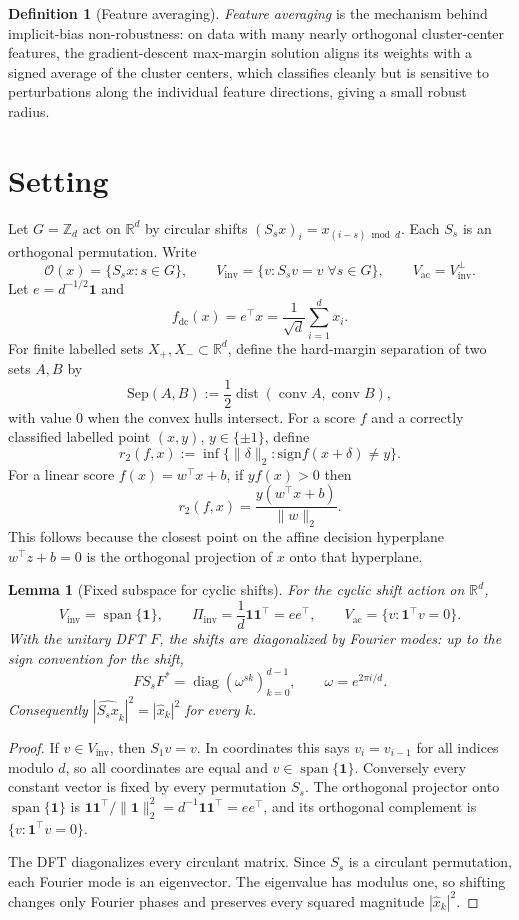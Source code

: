 \documentclass[11pt]{article}
\theoremstyle{plain}
\newtheorem{lemma}{Lemma}
\theoremstyle{definition}
\newtheorem{definition}{Definition}
\theoremstyle{remark}
\newcommand{\R}{\mathbb{R}}
\newcommand{\Z}{\mathbb{Z}}
\newcommand{\fdc}{f_{\mathrm{dc}}}
\newcommand{\Vinv}{V_{\mathrm{inv}}}
\newcommand{\Vac}{V_{\mathrm{ac}}}
\newcommand{\Sep}{\mathrm{Sep}}
\newcommand{\one}{\mathbf 1}
\newcommand{\Piinv}{\Pi_{\mathrm{inv}}}
\newcommand{\sign}{\mathrm{sign}}
\newcommand{\conv}{\operatorname{conv}}
\newcommand{\dist}{\operatorname{dist}}
\newcommand{\Orb}{\mathcal O}
\begin{document}
\begin{definition}[Feature averaging]
\emph{Feature averaging} \citep{LiFeature2024} is the mechanism behind implicit-bias non-robustness: on data with many nearly orthogonal cluster-center features, the gradient-descent max-margin solution aligns its weights with a signed average of the cluster centers, which classifies cleanly but is sensitive to perturbations along the individual feature directions, giving a small robust radius.
\end{definition}

\section{Setting}
Let $G=\Z_d$ act on $\R^d$ by circular shifts $(S_sx)_i=x_{(i-s)\bmod d}$.  Each $S_s$ is an orthogonal permutation.  Write
\[
\Orb(x)=\{S_sx:s\in G\},\qquad
\Vinv=\{v:S_sv=v\;\forall s\in G\},\qquad \Vac=\Vinv^\perp.
\]
Let $e=d^{-1/2}\one$ and
\[
\fdc(x)=e^\top x=\frac{1}{\sqrt d}\sum_{i=1}^d x_i.
\]
For finite labelled sets $X_+,X_-\subset\R^d$, define the hard-margin separation of two sets $A,B$ by
\[
\Sep(A,B):=\frac12\dist(\conv A,\conv B),
\]
with value $0$ when the convex hulls intersect.  For a score $f$ and a correctly classified labelled point $(x,y)$, $y\in\{\pm1\}$, define
\[
r_2(f,x):=\inf\{\|\delta\|_2:\sign f(x+\delta)\ne y\}.
\]
For a linear score $f(x)=w^\top x+b$, if $y f(x)>0$ then
\[
r_2(f,x)=\frac{y(w^\top x+b)}{\|w\|_2}.
\]
This follows because the closest point on the affine decision hyperplane $w^\top z+b=0$ is the orthogonal projection of $x$ onto that hyperplane.

\begin{lemma}[Fixed subspace for cyclic shifts]\label{lem:cyclic-fixed}
For the cyclic shift action on $\R^d$,
\[
\Vinv=\operatorname{span}\{\one\},\qquad \Piinv=\frac1d\one\one^\top=ee^\top,
\qquad \Vac=\{v:\one^\top v=0\}.
\]
With the unitary DFT $F$, the shifts are diagonalized by Fourier modes: up to the sign convention for the shift,
\[
F S_s F^*=\operatorname{diag}(\omega^{sk})_{k=0}^{d-1},\qquad \omega=e^{2\pi i/d}.
\]
Consequently $|\widehat{S_sx}_k|^2=|\hat x_k|^2$ for every $k$.
\end{lemma}

\begin{proof}
If $v\in\Vinv$, then $S_1v=v$.  In coordinates this says $v_i=v_{i-1}$ for all indices modulo $d$, so all coordinates are equal and $v\in\operatorname{span}\{\one\}$.  Conversely every constant vector is fixed by every permutation $S_s$.  The orthogonal projector onto $\operatorname{span}\{\one\}$ is $\one\one^\top/\|\one\|_2^2=d^{-1}\one\one^\top=ee^\top$, and its orthogonal complement is $\{v:\one^\top v=0\}$.

The DFT diagonalizes every circulant matrix.  Since $S_s$ is a circulant permutation, each Fourier mode is an eigenvector.  The eigenvalue has modulus one, so shifting changes only Fourier phases and preserves every squared magnitude $|\hat x_k|^2$.
\end{proof}
\end{document}
